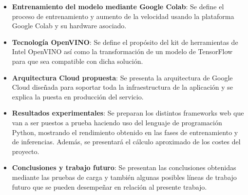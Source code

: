 \begin{itemize}
    \item \textbf{Entrenamiento del modelo mediante Google Colab}: Se define el proceso de entrenamiento y aumento de la velocidad usando la plataforma Google Colab y su hardware asociado.
    \item \textbf{Tecnología OpenVINO}: Se define el propósito del kit de herramientas de Intel OpenVINO así como la transformación de un modelo de TensorFlow para que sea compatible con dicha solución.
    \item \textbf{Arquitectura Cloud propuesta}: Se presenta la arquitectura de Google Cloud diseñada para soportar toda la infraestructura de la aplicación y se explica la puesta en producción del servicio.
    \item \textbf{Resultados experimentales}: Se preparan los distintos frameworks web que van a ser puestos a prueba haciendo uso del lenguaje de programación Python, mostrando el rendimiento obtenido en las fases de entrenamiento y de inferencias. Además, se presentará el cálculo aproximado de los costes del proyecto.
    \item \textbf{Conclusiones y trabajo futuro}: Se presentan las conclusiones obtenidas mediante las pruebas de carga y también algunas posibles líneas de trabajo futuro que se pueden desempeñar en relación al presente trabajo.
\end{itemize}